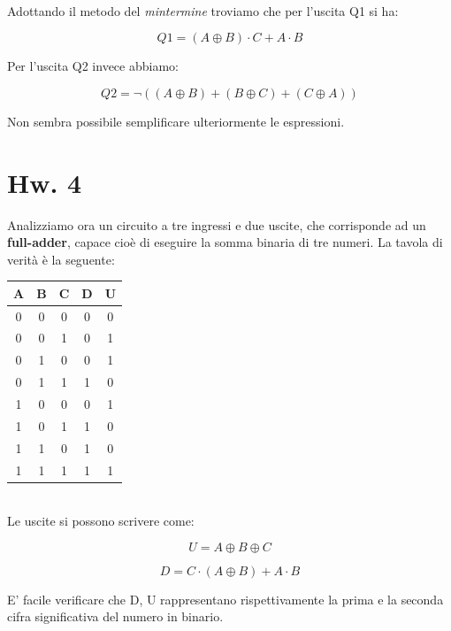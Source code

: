 \documentclass[journal, a4paper]{IEEEtran}
\begin{document}
~\\
Adottando il metodo del \textit{mintermine} troviamo che per l'uscita Q1 si ha:

\begin{equation}
Q1 = (A\oplus B)\cdot C + A\cdot B
\end{equation}

Per l'uscita Q2 invece abbiamo:

\begin{equation}
Q2 = \lnot((A\oplus B) + (B\oplus C) + (C\oplus A))
\end{equation}

Non sembra possibile semplificare ulteriormente le espressioni.

\section{Hw. 4}
Analizziamo ora un circuito a tre ingressi e due uscite, che corrisponde ad un \textbf{full-adder}, capace cioè di eseguire la somma binaria di tre numeri. La tavola di verità è la seguente: 

\begin{table}[h]
\centering
\begin{tabular}{c|c|c||c|c}
\hline \textbf{A} & \textbf{B} & \textbf{C} & \textbf{D} & \textbf{U} \\ 
\hline 
 0 & 0 & 0 & 0 & 0 \\ 
 0 & 0 & 1 & 0 & 1 \\ 
 0 & 1 & 0 & 0 & 1 \\ 
 0 & 1 & 1 & 1 & 0 \\ 
 1 & 0 & 0 & 0 & 1 \\ 
 1 & 0 & 1 & 1 & 0 \\ 
 1 & 1 & 0 & 1 & 0 \\ 
 1 & 1 & 1 & 1 & 1 \\ 
\hline
\end{tabular} 
\end{table}
~\\

Le uscite si possono scrivere come:

\begin{equation}
U = A \oplus B \oplus C
\end{equation}

\begin{equation}
D = C \cdot (A \oplus B) + A\cdot B
\end{equation}

E' facile verificare che D, U rappresentano rispettivamente la prima e la seconda cifra significativa del numero in binario.
\end{document}
